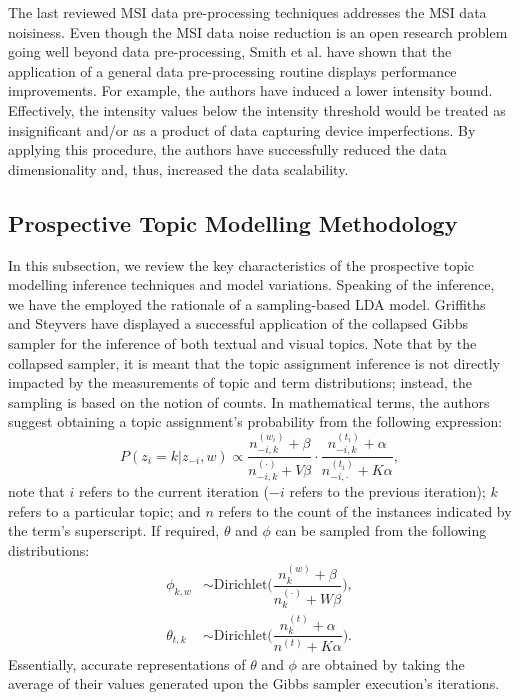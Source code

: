 \documentclass{mpaper}
\begin{document}
\par The last reviewed MSI data pre-processing techniques addresses the MSI data noisiness. Even though the MSI data noise reduction is an open research problem going well beyond data pre-processing, Smith et al. \cite{smith2014proteomics} have shown that the application of a general data pre-processing routine displays performance improvements. For example, the authors have induced a lower intensity bound. Effectively, the intensity values below the intensity threshold would be treated as insignificant and/or as a product of data capturing device imperfections. By applying this procedure, the authors have successfully reduced the data dimensionality and, thus, increased the data scalability.

\subsection{Prospective Topic Modelling Methodology}

\par In this subsection, we review the key characteristics of the prospective topic modelling inference techniques and model variations. Speaking of the inference, we have the employed the rationale of a sampling-based LDA model. Griffiths and Steyvers \cite{griffiths2004finding} have displayed a successful application of the collapsed Gibbs sampler for the inference of both textual and visual topics. Note that by the collapsed sampler, it is meant that the topic assignment inference is not directly impacted by the measurements of topic and term distributions; instead, the sampling is based on the notion of counts. In mathematical terms, the authors suggest obtaining a topic assignment's probability from the following expression:
\begin{equation}
P(z_i = k | z_{-i}, w) \propto \dfrac{n_{-i, k}^{(w_i)} + \beta}{n_{-i, k}^{(\cdot)} + V\beta}\cdot \dfrac{n_{-i, k}^{(t_i)} + \alpha}{n_{-i, \cdot}^{(t_i)} + K\alpha},
\end{equation}
note that $i$ refers to the current iteration ($-i$ refers to the previous iteration); $k$ refers to a particular topic; and $n$ refers to the count of the instances indicated by the term's superscript. If required, $\theta$ and $\phi$ can be sampled from the following distributions:
\begin{align}
\phi_{k,w} & \sim \mbox{Dirichlet}\bigg(\dfrac{n_{k}^{(w)} + \beta}{n_{k}^{(\cdot)} + W\beta}\bigg),\\
\theta_{t,k} & \sim \mbox{Dirichlet}\bigg(\dfrac{n_{k}^{(t)} + \alpha}{n^{(t)} + K\alpha}\bigg).
\end{align}
Essentially, accurate representations of $\theta$ and $\phi$ are obtained by taking the average of their values generated upon the Gibbs sampler execution's iterations.
\end{document}
